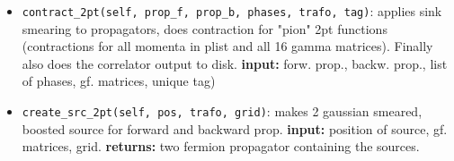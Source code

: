 \documentclass[a4paper,10pt]{scrartcl}
\begin{document}
\begin{itemize}
    \item \lstinline{contract_2pt(self, prop_f, prop_b, phases, trafo, tag)}: applies sink smearing to propagators, 
    does contraction for "pion" 2pt functions (contractions for all momenta in plist and all 16 gamma matrices). Finally also does
    the correlator output to disk.
    \newline \textbf{input:} forw. prop., backw. prop., list of phases, gf. matrices, unique tag)
    \item \lstinline{create_src_2pt(self, pos, trafo, grid)}: makes 2 gaussian smeared, boosted source for forward and backward prop.
            \newline \textbf{input:} position of source, gf. matrices, grid.
            \newline \textbf{returns:} two fermion propagator containing the sources.
\end{itemize}
\end{document}
